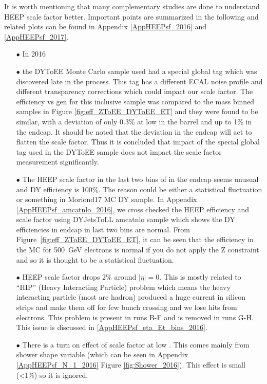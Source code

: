 It is worth mentioning that many complementary studies are done to understand HEEP scale factor better. Important points are summarized in the following and related plots can be found in Appendix \ref{AppHEEPsf_2016} and \ref{AppHEEPsf_2017}.
\begin{itemize}
  \item[$\bullet$] In 2016
  \item[$\bullet$] the DYToEE Monte Carlo sample used had a special global tag which was discovered late in the process. This tag has a different ECAL noise profile and different transparency corrections which could impact our scale factor. The efficiency vs gen \et for this inclusive sample was compared to the mass binned samples in Figure \ref{fig:eff_ZToEE_DYToEE_ET} and they were found to be similar, with a deviation of only 0.3\% at low \et in the barrel and up to 1\% in the endcap. It should be noted that the deviation in the endcap will act to flatten the scale factor. Thus it is concluded that impact of the special global tag used in the DYToEE sample does not impact the scale factor measurement significantly.
  \item[$\bullet$] The HEEP scale factor in the last two bins of \et in the endcap seems unusual and DY efficiency is 100\%. The reason could be either a statistical fluctuation or something in Moriond17 MC DY sample. In Appendix \ref{AppHEEPsf_amcatnlo_2016}, we cross checked the HEEP efficiency and scale factor using DYJetsToLL amcatnlo sample which shows the DY efficiencies in endcap in last two bins are normal. From Figure~\ref{fig:eff_ZToEE_DYToEE_ET}, it can be seen that the efficiency in the MC for 500~GeV electrons is normal if you do not apply the Z constraint and so it is thought to be a statistical fluctuation.
  \item[$\bullet$] HEEP scale factor drops 2\% around $|\eta|=0$. This is mostly related to ``HIP'' (Heavy Interacting Particle) problem which means the heavy interacting particle (most are hadron) produced a huge current in silicon strips and make them off for few bunch crossing and we lose hits from electrons. This problem is present in runs B-F and is removed in runs G-H. This issue is discussed in \ref{AppHEEPsf_eta_Et_bins_2016}.
  \item[$\bullet$] There is a turn on effect of scale factor at low \et. This comes mainly from shower shape variable (which can be seen in Appendix \ref{AppHEEPsf_N_1_2016} Figure \ref{fig:Shower_2016}). This effect is small (<1\%) so it is ignored.
\end{itemize}
